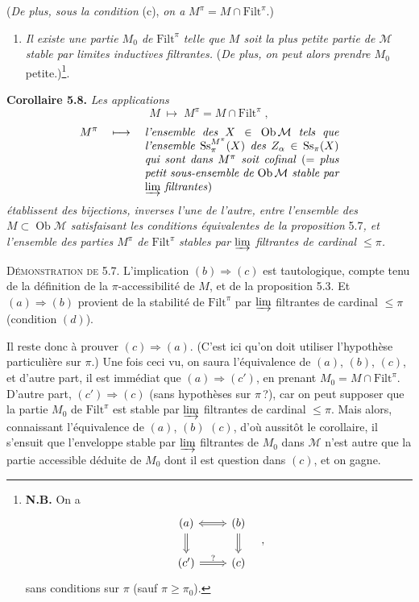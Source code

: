 \documentclass[11pt]{article}
\newcommand{\printedpage}[1]{\marginpar{\footnotesize p.~#1}}
\newcommand{\msp}[1]{\marginpar{\footnotesize [#1]}}
\newcommand{\M}{\mathcal{M}}
\newcommand{\Filt}{\mathrm{Filt}}
\newcommand{\Ob}{\operatorname{Ob}}
\newcommand{\Ss}{\mathrm{Ss}}
\begin{document}
(\textit{De plus, sous la condition} (c), \textit{on a}
\printedpage{35}
\msp{page 58}
$M^\pi = M \cap \Filt^\pi$.)
\begin{enumerate}[label={}]
\item[c$'$)] \textit{Il existe une partie $M_0$ de} $\Filt^\pi$ \textit{telle que $M$ soit la plus petite partie de $\M$ stable par limites inductives filtrantes.} (\textit{De plus, on peut alors prendre $M_0$} petite.)\footnote[22]{\textbf{N.B.} On a
\[
\begin{tikzcd}[ampersand replacement=\&]
(a) \arrow[r, Leftrightarrow] \arrow[d, Rightarrow] \& (b) \arrow[d, Rightarrow] \\
(c') \arrow[r, Rightarrow, "?"] \& (c)
\end{tikzcd}
\quad ,
\]
sans conditions sur $\pi$ (sauf $\pi \geq \pi_0$).}.
\end{enumerate}

\textbf{Corollaire 5.8.} \textit{Les applications}
\[
M \;\longmapsto\; M^\pi = M \cap \Filt^\pi \;,
\]
\[
M^\pi \quad\longmapsto\quad \parbox[t]{0.5\textwidth}{\textit{l'ensemble des $X \in \Ob\M$ tels que l'ensemble $\Ss_\pi^{M^\pi}(X)$ des $Z_\alpha \in \Ss_\pi(X)$ qui sont dans $M^\pi$ soit cofinal} (= \textit{plus petit sous-ensemble de $\Ob\M$ stable par $\varinjlim$ filtrantes})}
\]
\textit{établissent des bijections, inverses l'une de l'autre, entre l'ensemble des $M \subset \Ob\M$ satisfaisant les conditions équivalentes de la proposition} 5.7\textit{, et l'ensemble des parties $M^\pi$ de} $\Filt^\pi$ \textit{stables par $\varinjlim$ filtrantes de cardinal $\leq \pi$.}

\textsc{Démonstration de} 5.7. L'implication $(b) \Longrightarrow (c)$ est tautologique, compte tenu de la définition de la $\pi$-accessibilité de $M$, et de la proposition 5.3. Et $(a) \Longrightarrow (b)$ provient de la stabilité de $\Filt^\pi$ par $\varinjlim$ filtrantes de cardinal $\leq \pi$ (condition $(d)$).

Il reste donc à prouver $(c) \Longrightarrow (a)$. (C'est ici qu'on doit utiliser l'hypothèse particulière sur $\pi$.) Une fois ceci vu, on saura l'équivalence de $(a)$, $(b)$, $(c)$, et d'autre part, il est immédiat que $(a) \Longrightarrow (c')$, en
\msp{page 59}
prenant $M_0 = M \cap \Filt^\pi$. D'autre part, $(c') \Longrightarrow (c)$ (sans hypothèses sur $\pi\,$?), car on peut supposer que la partie $M_0$ de $\Filt^\pi$ est stable par $\varinjlim$ filtrantes de cardinal $\leq \pi$. Mais alors, connaissant l'équivalence de $(a)$, $(b)$ $(c)$, d'où aussitôt le corollaire, il s'ensuit que l'enveloppe stable par $\varinjlim$ filtrantes de $M_0$ dans $\M$ n'est autre que la partie accessible déduite de $M_0$ dont il est question dans $(c)$, et on gagne. %
\end{document}
